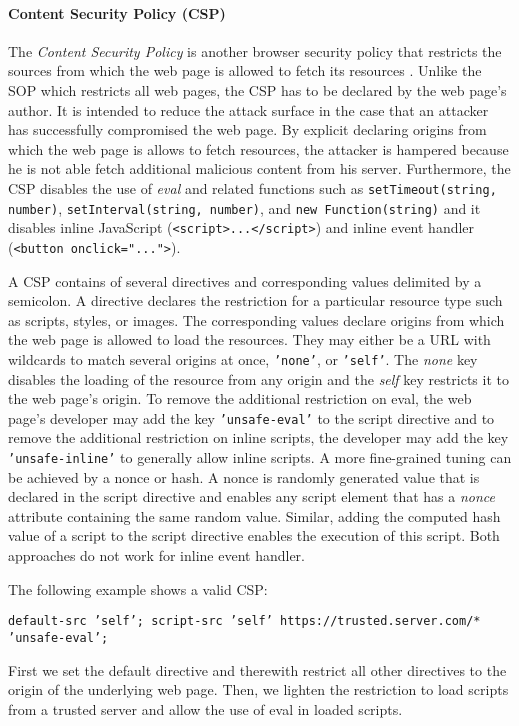 \paragraph{Content Security Policy (CSP)}

	The \textit{Content Security Policy} is another browser security policy that restricts the sources from which the web page is allowed to fetch its resources \cite{w3cContentSecurityPolicySpecification}. Unlike the SOP which restricts all web pages, the CSP has to be declared by the web page's author. It is intended to reduce the attack surface in the case that an attacker has successfully compromised the web page. By explicit declaring origins from which the web page is allows to fetch resources, the attacker is hampered because he is not able fetch additional malicious content from his server. Furthermore, the CSP disables the use of \textit{eval} and related functions such as \texttt{setTimeout(string, number)}, \texttt{setInterval(string, number)}, and \texttt{new Function(string)} and it disables inline JavaScript (\texttt{<script>...</script>}) and inline event handler (\texttt{<button onclick="...">}).
	
	A CSP contains of several directives and corresponding values delimited by a semicolon. A directive declares the restriction for a particular resource type such as scripts, styles, or images. The corresponding values declare origins from which the web page is allowed to load the resources. They may either be a URL with wildcards to match several origins at once, \texttt{'none'}, or \texttt{'self'}. The \textit{none} key disables the loading of the resource from any origin and the \textit{self} key restricts it to the web page's origin. To remove the additional restriction on eval, the web page's developer may add the key \texttt{'unsafe-eval'} to the script directive and to remove the additional restriction on inline scripts, the developer may add the key \texttt{'unsafe-inline'} to generally allow inline scripts. A more fine-grained tuning can be achieved by a nonce or hash. A nonce is randomly generated value that is declared in the script directive and enables any script element that has a \textit{nonce} attribute containing the same random value. Similar, adding the computed hash value of a script to the script directive enables the execution of this script. Both approaches do not work for inline event handler.
	
	The following example shows a valid CSP:
	\begin{center}
		\texttt{default-src 'self'; script-src 'self' https://trusted.server.com/* 'unsafe-eval';}
	\end{center}
	First we set the default directive and therewith restrict all other directives to the origin of the underlying web page. Then, we lighten the restriction to load scripts from a trusted server and allow the use of eval in loaded scripts.

